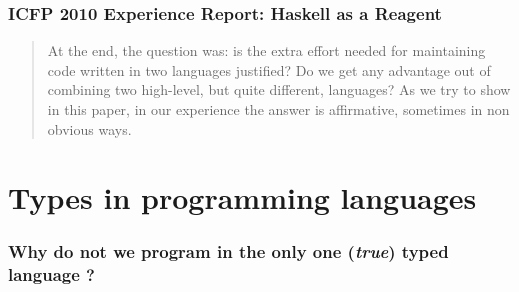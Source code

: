 \documentclass{beamer}
\begin{document}
\begin{frame}

\frametitle{ICFP 2010 Experience Report: Haskell as a Reagent}

    \begin{quotation}
    
        At the end, the question was: is the extra effort needed for
        maintaining code written in two languages justified? Do we get
        any advantage out of combining two high-level, but quite
        different, languages?  As we try to show in this paper, in our
        experience the answer is affirmative, sometimes in non obvious
        ways.
    
    \end{quotation}

\end{frame}


\section{Types in programming languages} %
\label{sec:Types in programming languages}

\begin{frame}

    \frametitle{Why do not we program in the only one (\textit{true}) typed language ?}

    \begin{itemize}
    
    
    

    
    \end{itemize}

\end{frame}
\end{document}
